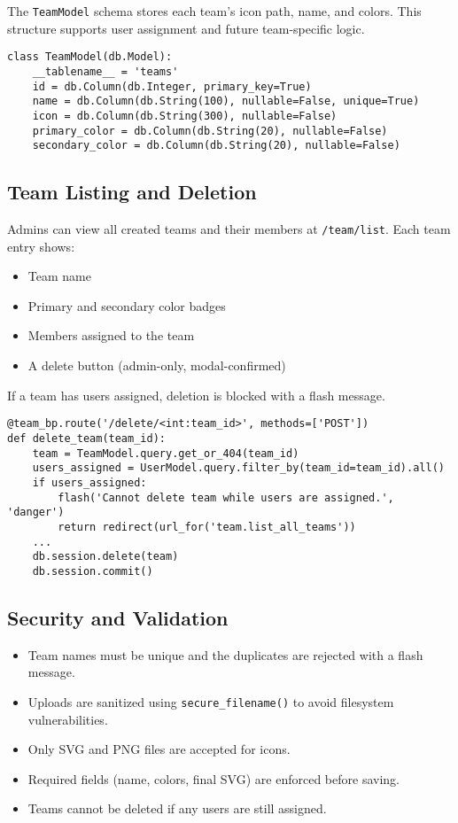 \documentclass[12pt]{article}
\begin{document}
The \texttt{TeamModel} schema stores each team’s icon path, name, and colors. This structure supports user assignment and future team-specific logic.

\begin{verbatim}
class TeamModel(db.Model):
    __tablename__ = 'teams'
    id = db.Column(db.Integer, primary_key=True)
    name = db.Column(db.String(100), nullable=False, unique=True)
    icon = db.Column(db.String(300), nullable=False)
    primary_color = db.Column(db.String(20), nullable=False)
    secondary_color = db.Column(db.String(20), nullable=False)
\end{verbatim}

\subsection{Team Listing and Deletion}

Admins can view all created teams and their members at \texttt{/team/list}. Each team entry shows:

\begin{itemize}
    \item Team name
    \item Primary and secondary color badges
    \item Members assigned to the team
    \item A delete button (admin-only, modal-confirmed)
\end{itemize}

\noindent If a team has users assigned, deletion is blocked with a flash message.

\begin{verbatim}
@team_bp.route('/delete/<int:team_id>', methods=['POST'])
def delete_team(team_id):
    team = TeamModel.query.get_or_404(team_id)
    users_assigned = UserModel.query.filter_by(team_id=team_id).all()
    if users_assigned:
        flash('Cannot delete team while users are assigned.', 'danger')
        return redirect(url_for('team.list_all_teams'))
    ...
    db.session.delete(team)
    db.session.commit()
\end{verbatim}

\subsection{Security and Validation}

\begin{itemize}
    \item Team names must be unique and the duplicates are rejected with a flash message.
    \item Uploads are sanitized using \texttt{secure\_filename()} to avoid filesystem vulnerabilities.
    \item Only SVG and PNG files are accepted for icons.
    \item Required fields (name, colors, final SVG) are enforced before saving.
    \item Teams cannot be deleted if any users are still assigned.
\end{itemize}
\end{document}
